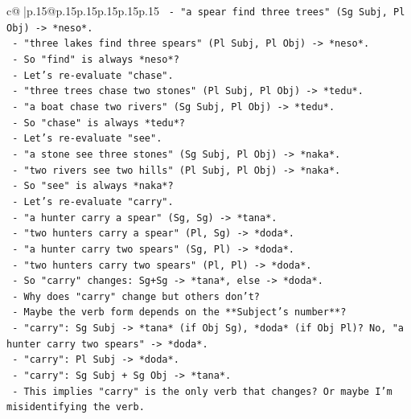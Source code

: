 \documentclass{article}
\begin{document}
{\begin{supertabular}{c@{$\;$}|p{.15\linewidth}@{}p{.15\linewidth}p{.15\linewidth}p{.15\linewidth}p{.15\linewidth}p{.15\linewidth}}
{{{\texttt{         {-} "a spear find three trees" (Sg Subj, Pl Obj) {-}> *neso*.} \\
\texttt{         {-} "three lakes find three spears" (Pl Subj, Pl Obj) {-}> *neso*.} \\
\texttt{         {-} So "find" is always *neso*?} \\
\texttt{       {-} Let's re{-}evaluate "chase".} \\
\texttt{         {-} "three trees chase two stones" (Pl Subj, Pl Obj) {-}> *tedu*.} \\
\texttt{         {-} "a boat chase two rivers" (Sg Subj, Pl Obj) {-}> *tedu*.} \\
\texttt{         {-} So "chase" is always *tedu*?} \\
\texttt{       {-} Let's re{-}evaluate "see".} \\
\texttt{         {-} "a stone see three stones" (Sg Subj, Pl Obj) {-}> *naka*.} \\
\texttt{         {-} "two rivers see two hills" (Pl Subj, Pl Obj) {-}> *naka*.} \\
\texttt{         {-} So "see" is always *naka*?} \\
\texttt{       {-} Let's re{-}evaluate "carry".} \\
\texttt{         {-} "a hunter carry a spear" (Sg, Sg) {-}> *tana*.} \\
\texttt{         {-} "two hunters carry a spear" (Pl, Sg) {-}> *doda*.} \\
\texttt{         {-} "a hunter carry two spears" (Sg, Pl) {-}> *doda*.} \\
\texttt{         {-} "two hunters carry two spears" (Pl, Pl) {-}> *doda*.} \\
\texttt{         {-} So "carry" changes: Sg+Sg {-}> *tana*, else {-}> *doda*.} \\
\texttt{       {-} Why does "carry" change but others don't?} \\
\texttt{       {-} Maybe the verb form depends on the **Subject's number**?} \\
\texttt{         {-} "carry": Sg Subj {-}> *tana* (if Obj Sg), *doda* (if Obj Pl)? No, "a hunter carry two spears" {-}> *doda*.} \\
\texttt{         {-} "carry": Pl Subj {-}> *doda*.} \\
\texttt{         {-} "carry": Sg Subj + Sg Obj {-}> *tana*.} \\
\texttt{         {-} This implies "carry" is the only verb that changes? Or maybe I'm misidentifying the verb.} \\
}}}
\end{supertabular}}
\end{document}

